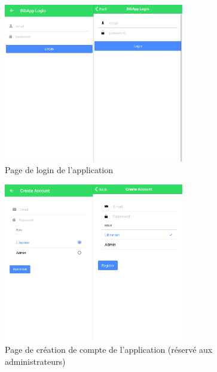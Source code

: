 \documentclass[a4paper, 12pt]{article}
\begin{document}
\begin{figure}
    \begin{center}
        \includegraphics[width=0.7\textwidth]{images/screenshots/android_iphone_5.png}
    \end{center}
    \caption{Page de login de l'application}
\end{figure}
\begin{figure}
    \begin{center}
        \includegraphics[width=0.7\textwidth]{images/screenshots/android_iphone_6.png}
    \end{center}
    \caption{Page de création de compte de l'application (réservé aux administrateurs)}
\end{figure}
\end{document}

